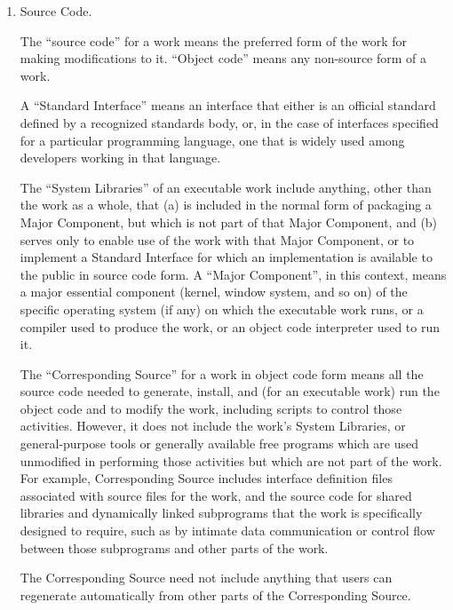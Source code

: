 \documentclass[11pt]{article}
\begin{document}
\begin{enumerate}
    \item Source Code.

          The ``source code'' for a work means the preferred form of the work
          for making modifications to it.  ``Object code'' means any non-source
          form of a work.

          A ``Standard Interface'' means an interface that either is an official
          standard defined by a recognized standards body, or, in the case of
          interfaces specified for a particular programming language, one that
          is widely used among developers working in that language.

          The ``System Libraries'' of an executable work include anything, other
          than the work as a whole, that (a) is included in the normal form of
          packaging a Major Component, but which is not part of that Major
          Component, and (b) serves only to enable use of the work with that
          Major Component, or to implement a Standard Interface for which an
          implementation is available to the public in source code form.  A
          ``Major Component'', in this context, means a major essential component
          (kernel, window system, and so on) of the specific operating system
          (if any) on which the executable work runs, or a compiler used to
          produce the work, or an object code interpreter used to run it.

          The ``Corresponding Source'' for a work in object code form means all
          the source code needed to generate, install, and (for an executable
          work) run the object code and to modify the work, including scripts to
          control those activities.  However, it does not include the work's
          System Libraries, or general-purpose tools or generally available free
          programs which are used unmodified in performing those activities but
          which are not part of the work.  For example, Corresponding Source
          includes interface definition files associated with source files for
          the work, and the source code for shared libraries and dynamically
          linked subprograms that the work is specifically designed to require,
          such as by intimate data communication or control flow between those
          subprograms and other parts of the work.

          The Corresponding Source need not include anything that users
          can regenerate automatically from other parts of the Corresponding
          Source.


\end{enumerate}
\end{document}
